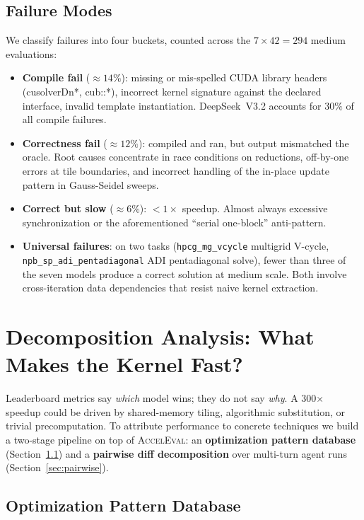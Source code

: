 \documentclass{article}
\begin{document}
\subsection{Failure Modes}
\label{sec:failures}

We classify failures into four buckets, counted across the $7 \times 42 = 294$ medium evaluations:
\begin{itemize}
  \item \textbf{Compile fail} ($\approx 14\%$): missing or mis-spelled CUDA library headers (cusolverDn*, cub::*), incorrect kernel signature against the declared interface, invalid template instantiation. DeepSeek~V3.2 accounts for $30\%$ of all compile failures.
  \item \textbf{Correctness fail} ($\approx 12\%$): compiled and ran, but output mismatched the oracle. Root causes concentrate in race conditions on reductions, off-by-one errors at tile boundaries, and incorrect handling of the in-place update pattern in Gauss-Seidel sweeps.
  \item \textbf{Correct but slow} ($\approx 6\%$): $<1\times$ speedup. Almost always excessive synchronization or the aforementioned ``serial one-block'' anti-pattern.
  \item \textbf{Universal failures}: on two tasks (\texttt{hpcg\_mg\_vcycle} multigrid V-cycle, \texttt{npb\_sp\_adi\_pentadiagonal} ADI pentadiagonal solve), fewer than three of the seven models produce a correct solution at medium scale. Both involve cross-iteration data dependencies that resist naive kernel extraction.
\end{itemize}

\section{Decomposition Analysis: What Makes the Kernel Fast?}
\label{sec:decomp}

Leaderboard metrics say \emph{which} model wins; they do not say \emph{why}. A 300$\times$ speedup could be driven by shared-memory tiling, algorithmic substitution, or trivial precomputation. To attribute performance to concrete techniques we build a two-stage pipeline on top of \textsc{AccelEval}: an \textbf{optimization pattern database} (Section~\ref{sec:pat-db}) and a \textbf{pairwise diff decomposition} over multi-turn agent runs (Section~\ref{sec:pairwise}).

\subsection{Optimization Pattern Database}
\label{sec:pat-db}
\end{document}
